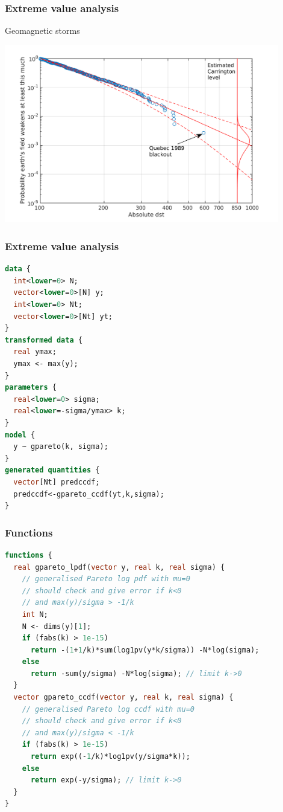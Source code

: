 \documentclass[10pt]{beamer}
\begin{document}
\begin{frame}

\frametitle{Extreme value analysis}

Geomagnetic storms

\includegraphics[width=12cm]{figs/stan_gpareto_geomev.png}

\end{frame}

\begin{frame}[fragile]

\frametitle{Extreme value analysis}
  {\small
  \begin{lstlisting}[language=Stan]
data {
  int<lower=0> N;
  vector<lower=0>[N] y;
  int<lower=0> Nt;
  vector<lower=0>[Nt] yt;
}
transformed data {
  real ymax;
  ymax <- max(y);
}
parameters {
  real<lower=0> sigma;
  real<lower=-sigma/ymax> k;
}
model {
  y ~ gpareto(k, sigma);
}
generated quantities {
  vector[Nt] predccdf;
  predccdf<-gpareto_ccdf(yt,k,sigma);
}
  \end{lstlisting}
}
\end{frame}

\begin{frame}[fragile]

\frametitle{Functions}
  {\footnotesize
  \begin{lstlisting}[language=Stan]
functions {
  real gpareto_lpdf(vector y, real k, real sigma) {
    // generalised Pareto log pdf with mu=0
    // should check and give error if k<0
    // and max(y)/sigma > -1/k
    int N;
    N <- dims(y)[1];
    if (fabs(k) > 1e-15)
      return -(1+1/k)*sum(log1pv(y*k/sigma)) -N*log(sigma);
    else
      return -sum(y/sigma) -N*log(sigma); // limit k->0
  }
  vector gpareto_ccdf(vector y, real k, real sigma) {
    // generalised Pareto log ccdf with mu=0
    // should check and give error if k<0
    // and max(y)/sigma < -1/k
    if (fabs(k) > 1e-15)
      return exp((-1/k)*log1pv(y/sigma*k));
    else
      return exp(-y/sigma); // limit k->0
  }
}
  \end{lstlisting}
}
\end{frame}
\end{document}
